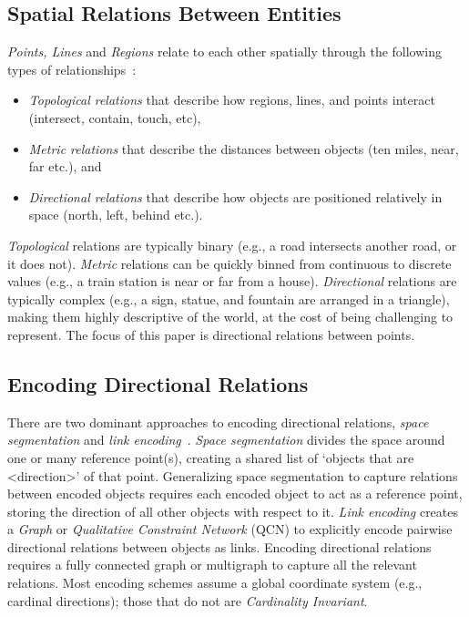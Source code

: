 \subsection{Spatial Relations Between Entities}
\par{
     \textit{Points, Lines} and \textit{Regions} relate to each other spatially through the following types of relationships~\cite{Carniel2020,Bertella2022,Carniel2023}:
    \begin{itemize}
        \item \textit{Topological relations} that describe how regions, lines, and points interact (intersect, contain, touch, etc),
        \item \textit{Metric relations} that describe the distances between objects (ten miles, near, far etc.), and
        \item \textit{Directional relations} that describe how objects are positioned relatively in space (north, left, behind etc.). %
    \end{itemize}

    \textit{Topological} relations are typically binary (e.g., a road intersects another road, or it does not). 
    \textit{Metric} relations can be quickly binned from continuous to discrete values (e.g., a train station is near or far from a house).
    \textit{Directional} relations are typically complex (e.g., a sign, statue, and fountain are arranged in a triangle), making them highly descriptive of the world, at the cost of being challenging to represent.
    The focus of this paper is directional relations between points. 

}

\subsection{Encoding Directional Relations}
\par{
    There are two dominant approaches to encoding directional relations, \textit{space segmentation} and \textit{link encoding}~\cite{Dellapenna2012, Dellapenna2017}.
%
    \textit{Space segmentation} divides the space around one or many reference point(s), creating a shared list of `objects that are <direction>' of that point. 
    Generalizing space segmentation to capture relations between encoded objects requires each encoded object to act as a reference point, storing the direction of all other objects with respect to it.
    \textit{Link encoding} creates a \textit{Graph} or \textit{Qualitative Constraint Network} (QCN) to explicitly encode pairwise directional relations between objects as links.
    Encoding directional relations requires a fully connected graph or multigraph to capture all the relevant relations.
%
    Most encoding schemes assume a global coordinate system (e.g., cardinal directions); those that do not are \textit{Cardinality Invariant}.

}


